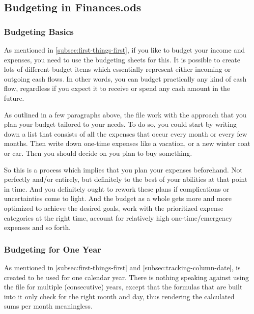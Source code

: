 \subsection{Budgeting in Finances.ods}
\label{subsec:budgeting-in-finances.ods}

\subsubsection{Budgeting Basics}
\label{subsubsec:budgeting-basics}

As mentioned in \autoref{subsec:first-things-first}, if you like to budget your income and expenses, you need to use the budgeting sheets for this.
It is possible to create lots of different budget items which essentially represent either incoming or outgoing cash flows.
In other words, you can budget practically any kind of cash flow, regardless if you expect it to receive or spend any cash amount in the future.

As outlined in a few paragraphs above, the file work with the approach that you plan your budget tailored to your needs.
To do so, you could start by writing down a list that consists of all the expenses that occur every month or every few months.
Then write down one-time expenses like a vacation, or a new winter coat or car.
Then you should decide on  you plan to buy something.

So this is a process which implies that you plan your expenses beforehand.
Not perfectly and/or entirely, but definitely to the best of your abilities at that point in time.
And you definitely ought to rework these plans if complications or uncertainties come to light.
And the budget as a whole gets more and more optimized to achieve the desired goals, work with the prioritized expense categories at the right time, account for relatively high one-time/emergency expenses and so forth.

\subsubsection{Budgeting for One Year}
\label{subsubsec:budgeting-for-one-year}

As mentioned in \autoref{subsec:first-things-first} and \autoref{subsec:tracking-column-date}, \tfn is created to be used for one calendar year.
There is nothing speaking against using the file for multiple (consecutive) years, except that the formulas that are built into it only check for the right month and day, thus rendering the calculated sums per month meaningless.

